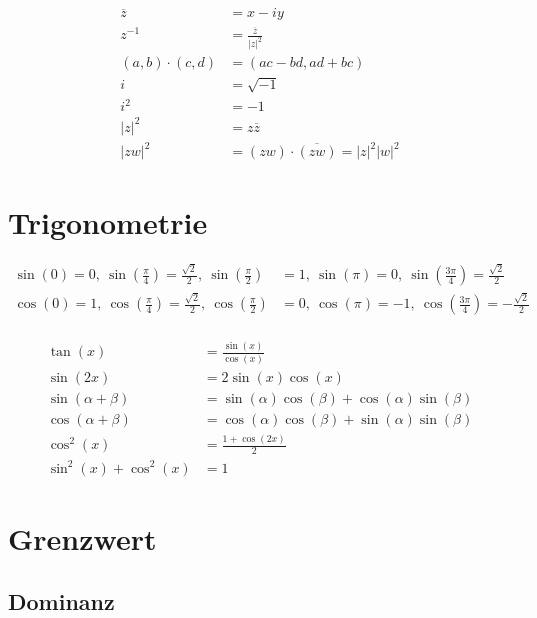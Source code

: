 \documentclass[11pt]{article}
\begin{document}
\begin{equation*}
\begin{split}
	\overline{z} & = x - iy\\
	z^{-1} & = \frac{\overline{z}}{|z|^2} \\
	(a,b) \cdot (c, d) & = (ac-bd, ad+bc) \\
	i & = \sqrt{-1}\\
	i^2 & = -1 \\
	|z|^2 & = z\overline{z} \\
	|zw|^2 & = (zw) \cdot \overline{(zw)} = |z|^2|w|^2
\end{split}
\end{equation*}

\section{Trigonometrie}

\begin{equation*}
\begin{split}
	\sin(0) = 0,\ \sin(\frac{\pi}{4}) = \frac{\sqrt{2}}{2},\ \sin(\frac{\pi}{2}) & = 1,\ \sin(\pi) = 0,\ \sin(\frac{3\pi}{4}) = \frac{\sqrt{2}}{2}\\
	\cos(0) = 1,\ \cos(\frac{\pi}{4}) = \frac{\sqrt{2}}{2},\ \cos(\frac{\pi}{2}) & = 0,\ \cos(\pi) = -1,\ \cos(\frac{3\pi}{4}) = -\frac{\sqrt{2}}{2}\\
\end{split}
\end{equation*}

\begin{equation*}
\begin{split}
	\tan(x) & = \frac{\sin(x)}{\cos(x)} \\
	\sin(2x) & = 2\sin(x)\cos(x) \\
	\sin(\alpha + \beta) & = \sin(\alpha)\cos(\beta) + \cos(\alpha)\sin(\beta) \\
	\cos(\alpha + \beta) & = \cos(\alpha)\cos(\beta) + \sin(\alpha)\sin(\beta) \\
	\cos^2(x) & = \frac{1 + \cos(2x)}{2} \\
	\sin^2(x) + \cos^2(x) & = 1
\end{split}
\end{equation*}

\section{Grenzwert}

\subsection{Dominanz}
\end{document}
